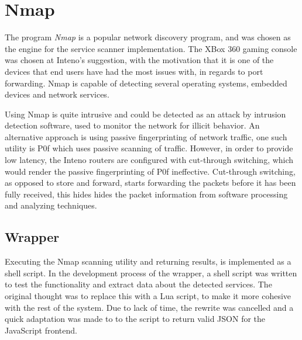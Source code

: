 \documentclass[a4paper,11pt,makeidx]{kth-bcs}
\begin{document}

\newpage
\section{Nmap}
The program \emph{Nmap} is a popular network discovery program, and was chosen as the engine for the service scanner implementation.
The XBox 360 gaming console was chosen at Inteno's suggestion, with the motivation that it is one of the devices that end users have had the most issues with, in regards to port forwarding.
Nmap is capable of detecting several operating systems, embedded devices and network services.

Using Nmap is quite intrusive and could be detected as an attack by intrusion detection software, used to monitor the network for illicit behavior.
An alternative approach is using passive fingerprinting of network traffic, one such utility is P0f which uses passive scanning of traffic.\cite{p0f}
However, in order to provide low latency, the Inteno routers are configured with cut-through switching, which would render the passive fingerprinting of P0f ineffective.
Cut-through switching, as opposed to store and forward, starts forwarding the packets before it has been fully received, this hides hides the packet information from software processing and analyzing techniques.

\subsection{Wrapper}
Executing the Nmap scanning utility and returning results, is implemented as a shell script.
In the development process of the wrapper, a shell script was written to test the functionality and extract data about the detected services.
The original thought was to replace this with a Lua script, to make it more cohesive with the rest of the system.
Due to lack of time, the rewrite was cancelled and a quick adaptation was made to to the script to return valid JSON for the JavaScript frontend.
\end{document}
